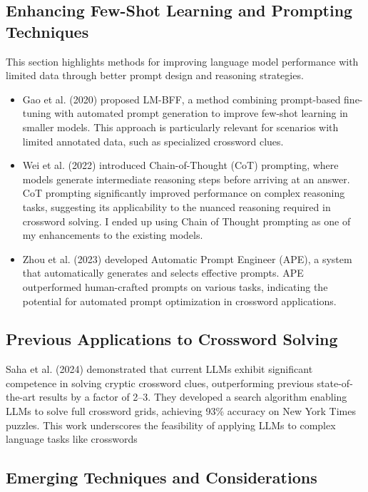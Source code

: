 \documentclass[
	a4paper, %
	10pt, %
	unnumberedsections, %
	twoside, %
]{LTJournalArticle}
\begin{document}
\subsection{Enhancing Few-Shot Learning and Prompting Techniques}

This section highlights methods for improving language model performance with limited data through better prompt design and reasoning strategies. 

\begin{itemize}
	\item Gao et al. (2020) proposed LM-BFF, a method combining prompt-based fine-tuning with automated prompt generation to improve few-shot learning in smaller models. This approach is particularly relevant for scenarios with limited annotated data, such as specialized crossword clues.
	\item Wei et al. (2022) introduced Chain-of-Thought (CoT) prompting, where models generate intermediate reasoning steps before arriving at an answer. CoT prompting significantly improved performance on complex reasoning tasks, suggesting its applicability to the nuanced reasoning required in crossword solving. I ended up using Chain of Thought prompting as one of my enhancements to the existing models.
	\item Zhou et al. (2023) developed Automatic Prompt Engineer (APE), a system that automatically generates and selects effective prompts. APE outperformed human-crafted prompts on various tasks, indicating the potential for automated prompt optimization in crossword applications.
\end{itemize}


\subsection{Previous Applications to Crossword Solving}

\noindent Saha et al. (2024) demonstrated that current LLMs exhibit significant competence in solving cryptic crossword clues, outperforming previous state-of-the-art results by a factor of 2–3. They developed a search algorithm enabling LLMs to solve full crossword grids, achieving 93\% accuracy on New York Times puzzles. This work underscores the feasibility of applying LLMs to complex language tasks like crosswords

\subsection{Emerging Techniques and Considerations}
\end{document}
